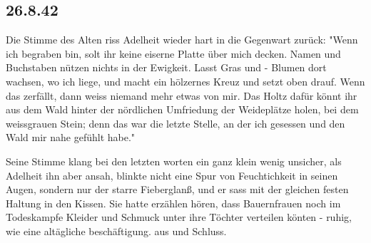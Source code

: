 \subsection{26.8.42}

Die Stimme des Alten riss Adelheit wieder hart in die Gegenwart zur\"{u}ck:
"Wenn ich begraben bin, solt ihr keine eiserne Platte \"{u}ber mich decken.
Namen und Buchstaben n\"{u}tzen nichts in der Ewigkeit.
Lasst Gras und - Blumen dort wachsen, wo ich liege, und macht ein h\"{o}lzernes Kreuz und setzt oben drauf.
Wenn das zerf\"{a}llt, dann weiss niemand mehr etwas von mir.
Das Holtz daf\"{u}r k\"{o}nnt ihr aus dem Wald hinter der n\"{o}rdlichen Umfriedung der Weidepl\"{a}tze holen, bei dem weissgrauen Stein; denn das war die letzte Stelle, an der ich gesessen und den Wald mir nahe gef\"{u}hlt habe."

Seine Stimme klang bei den letzten worten ein ganz klein wenig unsicher, als Adelheit ihn aber ansah, blinkte nicht eine Spur von Feuchtichkeit in seinen Augen, sondern nur der starre Fieberglan{\ss}, und er sass mit der gleichen festen Haltung in den Kissen.
Sie hatte erz\"{a}hlen h\"{o}ren, dass Bauernfrauen noch im Todeskampfe Kleider und Schmuck unter ihre T\"{o}chter verteilen k\"{o}nten - ruhig, wie eine alt\"{a}gliche besch\"{a}ftigung.
aus und Schluss.

\clearpage
